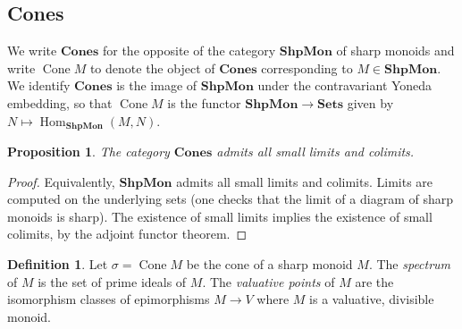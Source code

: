\documentclass[12pt]{amsart}
\theoremstyle{plan}
\newtheorem{proposition}[theorem]{Proposition}
\numberwithin{lemma}{theorem}
\numberwithin{corollary}{theorem}
\theoremstyle{definition}
\newtheorem{definition}[theorem]{Definition}
\theoremstyle{remark}
\def\ShpMon{\mathbf{ShpMon}}
\def\Hom{\operatorname{Hom}}
\def\Cones{\mathbf{Cones}}
\def\Cone{\operatorname{Cone}}
\def\Sets{\mathbf{Sets}}
\begin{document}
\subsection{Cones}

We write $\Cones$ for the opposite of the category $\ShpMon$ of sharp monoids and write $\Cone M$ to denote the object of $\Cones$ corresponding to $M \in \ShpMon$.   We identify $\Cones$ is the image of $\ShpMon$ under the contravariant Yoneda embedding, so that $\Cone M$ is the functor $\ShpMon \to \Sets$ given by $N \mapsto \Hom_{\ShpMon}(M,N)$.

\begin{proposition}
The category $\Cones$ admits all small limits and colimits.
\end{proposition}
\begin{proof}
Equivalently, $\ShpMon$ admits all small limits and colimits.  Limits are computed on the underlying sets (one checks that the limit of a diagram of sharp monoids is sharp).  The existence of small limits implies the existence of small colimits, by the adjoint functor theorem.
\end{proof}

\begin{definition}
Let $\sigma = \Cone M$ be the cone of a sharp monoid $M$.  The \emph{spectrum} of $M$ is the set of prime ideals of $M$.  The \emph{valuative points} of $M$ are the isomorphism classes of epimorphisms $M \to V$ where $M$ is a valuative, divisible monoid.
\end{definition}
\end{document}
